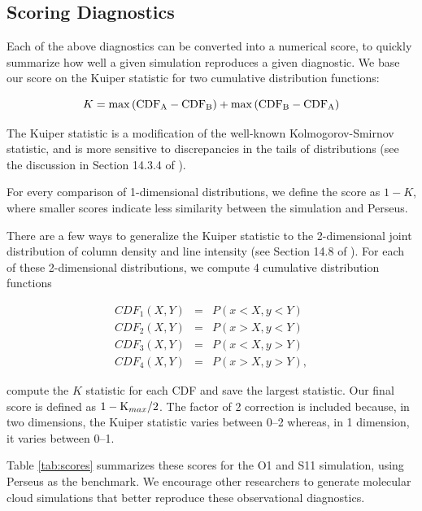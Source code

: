 \subsection{Scoring Diagnostics}
Each of the above diagnostics can be converted into a numerical score, to quickly summarize how well a given simulation reproduces a given diagnostic. We base our score on the Kuiper statistic for two cumulative distribution functions:

\begin{equation}
K = \max {\rm \left(CDF_A - CDF_B \right) + \max \left( CDF_B - CDF_A \right) }
\end{equation}

The Kuiper statistic is a modification of the well-known Kolmogorov-Smirnov statistic, and is more sensitive to discrepancies in the tails of distributions (see the discussion in Section 14.3.4 of \citealt{Press07}).

For every comparison of 1-dimensional distributions, we define the score as $1 - K$, where smaller scores indicate less similarity between the simulation and Perseus.

There are a few ways to generalize the Kuiper statistic to the 2-dimensional joint distribution of column density and line intensity (see Section 14.8 of \citealt{Press07}). For each of these 2-dimensional distributions, we compute 4 cumulative distribution functions

\begin{eqnarray}
CDF_1(X, Y) &=& P(x < X, y < Y) \\
CDF_2(X, Y) &=& P(x > X, y < Y) \\
CDF_3(X, Y) &= &P(x < X, y > Y) \\
CDF_4(X, Y) &=& P(x > X, y > Y),
\end{eqnarray}

compute the $K$ statistic for each CDF and save the largest statistic. Our final score is defined as $1 - {\rm K}_{max} / 2$. The factor of 2 correction is included because, in  two dimensions, the Kuiper statistic varies between 0--2 whereas, in 1 dimension, it varies between 0--1.

Table \ref{tab:scores} summarizes these scores for the O1 and S11 simulation, using Perseus as the benchmark. We encourage other researchers to generate molecular cloud simulations that better reproduce these observational diagnostics.



